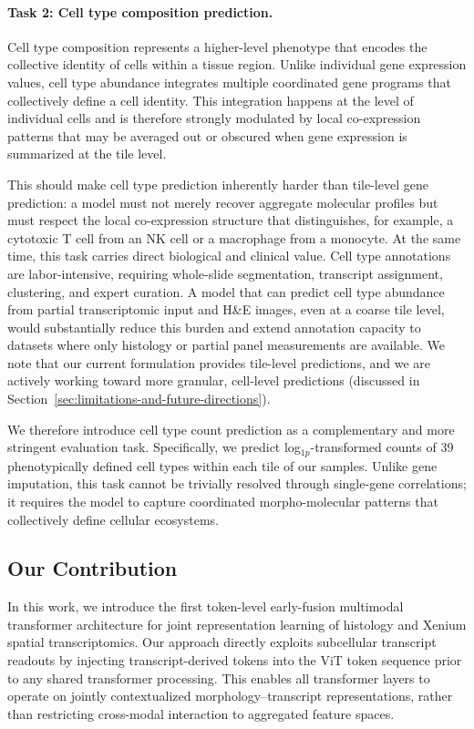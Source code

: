\paragraph{Task 2: Cell type composition prediction.}
Cell type composition represents a higher-level phenotype that encodes the collective identity of cells within a tissue region. Unlike individual gene expression values, cell type abundance integrates multiple coordinated gene programs that collectively define a cell identity. This integration happens at the level of individual cells and is therefore strongly modulated by local co-expression patterns that may be averaged out or obscured when gene expression is summarized at the tile level.

This should make cell type prediction inherently harder than tile-level gene prediction: a model must not merely recover aggregate molecular profiles but must respect the local co-expression structure that distinguishes, for example, a cytotoxic T cell from an NK cell or a macrophage from a monocyte. At the same time, this task carries direct biological and clinical value. Cell type annotations are labor-intensive, requiring whole-slide segmentation, transcript assignment, clustering, and expert curation. A model that can predict cell type abundance from partial transcriptomic input and H\&E images, even at a coarse tile level, would substantially reduce this burden and extend annotation capacity to datasets where only histology or partial panel measurements are available. We note that our current formulation provides tile-level predictions, and we are actively working toward more granular, cell-level predictions (discussed in Section~\ref{sec:limitations-and-future-directions}).

We therefore introduce cell type count prediction as a complementary and more stringent evaluation task. Specifically, we predict log$_{1p}$-transformed counts of 39 phenotypically defined cell types within each tile of our samples. Unlike gene imputation, this task cannot be trivially resolved through single-gene correlations; it requires the model to capture coordinated morpho-molecular patterns that collectively define cellular ecosystems.

\subsection*{Our Contribution}
\label{sec:our-contribution}

In this work, we introduce the first token-level early-fusion multimodal transformer architecture for joint representation learning of histology and Xenium spatial transcriptomics. Our approach directly exploits subcellular transcript readouts by injecting transcript-derived tokens into the ViT token sequence prior to any shared transformer processing. This enables all transformer layers to operate on jointly contextualized morphology--transcript representations, rather than restricting cross-modal interaction to aggregated feature spaces.


